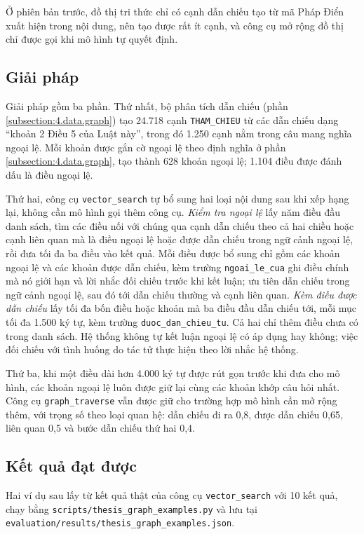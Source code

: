 \documentclass[../DoAn.tex]{subfiles}
\begin{document}
Ở phiên bản trước, đồ thị tri thức chỉ có cạnh dẫn chiếu tạo từ mã Pháp Điển xuất hiện trong nội dung, nên tạo được rất ít cạnh, và công cụ mở rộng đồ thị chỉ được gọi khi mô hình tự quyết định.

\subsection{Giải pháp}
Giải pháp gồm ba phần. Thứ nhất, bộ phân tích dẫn chiếu (phần \ref{subsection:4.data.graph}) tạo 24.718 cạnh \texttt{THAM\_CHIEU} từ các dẫn chiếu dạng ``khoản 2 Điều 5 của Luật này'', trong đó 1.250 cạnh nằm trong câu mang nghĩa ngoại lệ. Mỗi khoản được gắn cờ ngoại lệ theo định nghĩa ở phần \ref{subsection:4.data.graph}, tạo thành 628 khoản ngoại lệ; 1.104 điều được đánh dấu là điều ngoại lệ.

Thứ hai, công cụ \texttt{vector\_search} tự bổ sung hai loại nội dung sau khi xếp hạng lại, không cần mô hình gọi thêm công cụ. \emph{Kiểm tra ngoại lệ} lấy năm điều đầu danh sách, tìm các điều nối với chúng qua cạnh dẫn chiếu theo cả hai chiều hoặc cạnh liên quan mà là điều ngoại lệ hoặc được dẫn chiếu trong ngữ cảnh ngoại lệ, rồi đưa tối đa ba điều vào kết quả. Mỗi điều được bổ sung chỉ gồm các khoản ngoại lệ và các khoản được dẫn chiếu, kèm trường \texttt{ngoai\_le\_cua} ghi điều chính mà nó giới hạn và lời nhắc đối chiếu trước khi kết luận; ưu tiên dẫn chiếu trong ngữ cảnh ngoại lệ, sau đó tới dẫn chiếu thường và cạnh liên quan. \emph{Kèm điều được dẫn chiếu} lấy tối đa bốn điều hoặc khoản mà ba điều đầu dẫn chiếu tới, mỗi mục tối đa 1.500 ký tự, kèm trường \texttt{duoc\_dan\_chieu\_tu}. Cả hai chỉ thêm điều chưa có trong danh sách. Hệ thống không tự kết luận ngoại lệ có áp dụng hay không; việc đối chiếu với tình huống do tác tử thực hiện theo lời nhắc hệ thống.

Thứ ba, khi một điều dài hơn 4.000 ký tự được rút gọn trước khi đưa cho mô hình, các khoản ngoại lệ luôn được giữ lại cùng các khoản khớp câu hỏi nhất. Công cụ \texttt{graph\_traverse} vẫn được giữ cho trường hợp mô hình cần mở rộng thêm, với trọng số theo loại quan hệ: dẫn chiếu đi ra 0,8, được dẫn chiếu 0,65, liên quan 0,5 và bước dẫn chiếu thứ hai 0,4.

\subsection{Kết quả đạt được}
Hai ví dụ sau lấy từ kết quả thật của công cụ \texttt{vector\_search} với 10 kết quả, chạy bằng \texttt{scripts/\allowbreak{}thesis\_graph\_examples.py} và lưu tại \texttt{evaluation/\allowbreak{}results/\allowbreak{}thesis\_graph\_examples.json}.
\end{document}
